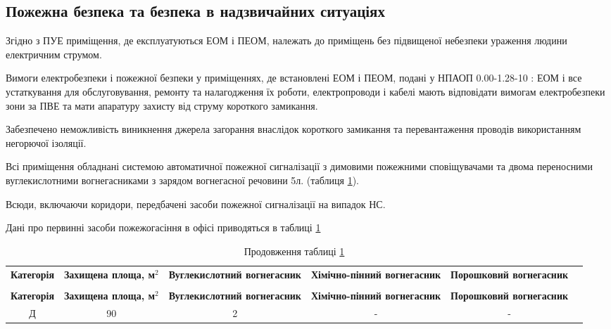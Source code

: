 \subsection{Пожежна безпека та безпека в надзвичайних ситуаціях}
\par Згідно з ПУЕ приміщення, де експлуатуються ЕОМ і ПЕОМ, належать до приміщень без підвищеної небезпеки ураження людини електричним струмом.
\par Вимоги електробезпеки і пожежної безпеки у приміщеннях, де встановлені ЕОМ і ПЕОМ, подані у НПАОП 0.00-1.28-10 \cite{safety_g_2}: ЕОМ і все устаткування для обслуговування, ремонту та налагодження їх роботи, електропроводи і кабелі мають відповідати вимогам електробезпеки зони за ПВЕ та мати апаратуру захисту від струму короткого замикання.

\par Забезпечено неможливість виникнення джерела загорання внаслідок короткого замикання та перевантаження проводів використанням негорючої ізоляції.

\par Всі приміщення обладнані системою автоматичної пожежної сигналізації з димовими пожежними сповіщувачами та двома переносними вуглекислотними вогнегасниками з зарядом вогнегасної речовини 5л. \cite{safety_vogon_nakaz} (таблиця \ref{t:safety_vogon}).

\par Всюди, включаючи коридори, передбачені засоби пожежної сигналізації на випадок НС.

\par Дані про первинні засоби пожежогасіння в офісі приводяться в таблиці \ref{t:safety_vogon}

{\footnotesize
\begin{longtable}{|c|c|c|c|c|c|}
\captionsetup{justification=centering}
\caption{первинні засоби пожежогасіння}\label{t:safety_vogon}\\
\hline
\multicolumn{1}{|c|}{\textbf{Категорія}}&
\multicolumn{1}{p{2cm}|}{\textbf{Захищена площа, м$^2$}}&
\multicolumn{1}{p{3cm}|}{\textbf{Вуглекислотний вогнегасник}}&
\multicolumn{1}{p{2cm}|}{\textbf{Хімічно-пінний вогнегасник}}&
\multicolumn{1}{p{3cm}|}{\textbf{Порошковий вогнегасник}}\\ \hline

\endfirsthead
\caption*{\hfill Продовження таблиці \ref{t:safety_vogon}}\\ \hline

\multicolumn{1}{|c|}{\textbf{Категорія}}&
\multicolumn{1}{p{2cm}|}{\textbf{Захищена площа, м$^2$}}&
\multicolumn{1}{p{3cm}|}{\textbf{Вуглекислотний вогнегасник}}&
\multicolumn{1}{p{2cm}|}{\textbf{Хімічно-пінний вогнегасник}}&
\multicolumn{1}{p{3cm}|}{\textbf{Порошковий вогнегасник}}\\ \hline
\endhead

Д & 90 & 2 & - & -  \\ \hline
\end{longtable}
}

